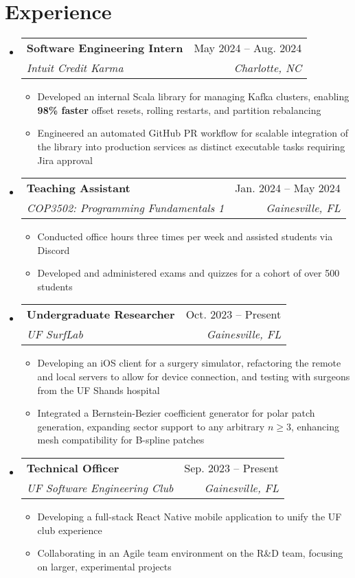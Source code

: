 \documentclass[letterpaper,12pt]{article}
\makeatletter
\newcommand{\resumeItem}[1]{
  \item\small{
    {#1 \vspace{-2pt}}
  }
}
\newcommand{\resumeSubheading}[4]{
  \vspace{-2pt}\item
    \begin{tabular*}{0.97\textwidth}[t]{l@{\extracolsep{\fill}}r}
      \textbf{#1} & #2 \\
      \textit{\small#3} & \textit{\small #4} \\
    \end{tabular*}\vspace{-7pt}
}
\newcommand{\resumeSubHeadingListStart}{\begin{itemize}[leftmargin=0.15in, label={}]}
\newcommand{\resumeSubHeadingListEnd}{\end{itemize}}
\newcommand{\resumeItemListStart}{\begin{itemize}}
\newcommand{\resumeItemListEnd}{\end{itemize}\vspace{-5pt}}
\makeatother
\begin{document}
\section{Experience}
  \resumeSubHeadingListStart
    \resumeSubheading
      {Software Engineering Intern}{May 2024 -- Aug. 2024}
      {Intuit Credit Karma}{Charlotte, NC}
      \resumeItemListStart
        \resumeItem{Developed an internal Scala library for managing Kafka clusters, enabling \textbf{98\% faster} offset resets, rolling restarts, and partition rebalancing}
        \resumeItem{Engineered an automated GitHub PR workflow for scalable integration of the library into production services as distinct executable tasks requiring Jira approval}
      \resumeItemListEnd
    \resumeSubheading
      {Teaching Assistant}{Jan. 2024 -- May 2024}
      {COP3502: Programming Fundamentals 1}{Gainesville, FL}
      \resumeItemListStart
        \resumeItem{Conducted office hours three times per week and assisted students via Discord}
        \resumeItem{Developed and administered exams and quizzes for a cohort of over 500 students}
      \resumeItemListEnd
    \resumeSubheading
      {Undergraduate Researcher}{Oct. 2023 -- Present}
      {UF SurfLab}{Gainesville, FL}
      \resumeItemListStart
        \resumeItem{Developing an iOS client for a surgery simulator, refactoring the remote and local servers to allow for device connection, and testing with surgeons from the UF Shands hospital}
        \resumeItem{Integrated a Bernstein-Bezier coefficient generator for polar patch generation, expanding sector support to any arbitrary $n \geq 3$, enhancing mesh compatibility for B-spline patches}
    \resumeItemListEnd
    \resumeSubheading
      {Technical Officer}{Sep. 2023 -- Present}
      {UF Software Engineering Club}{Gainesville, FL}
      \resumeItemListStart
        \resumeItem{Developing a full-stack React Native mobile application to unify the UF club experience}
        \resumeItem{Collaborating in an Agile team environment on the R\&D team, focusing on larger, experimental projects}
      \resumeItemListEnd
    \resumeSubHeadingListEnd
\end{document}
